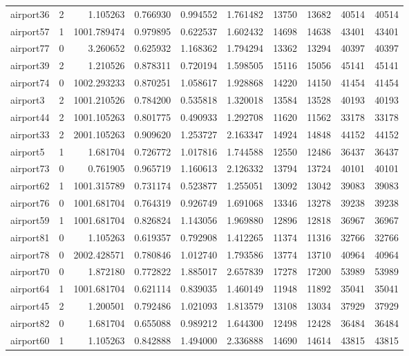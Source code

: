 \begin{longtable}{|l|r|r|r|r|r|r|r|r|r|}
airport36 & 2 & 1.105263 & 0.766930 & 0.994552 & 1.761482 & 13750 & 13682 & 40514 & 40514 \\
airport57 & 1 & 1001.789474 & 0.979895 & 0.622537 & 1.602432 & 14698 & 14638 & 43401 & 43401 \\
airport77 & 0 & 3.260652 & 0.625932 & 1.168362 & 1.794294 & 13362 & 13294 & 40397 & 40397 \\
airport39 & 2 & 1.210526 & 0.878311 & 0.720194 & 1.598505 & 15116 & 15056 & 45141 & 45141 \\
airport74 & 0 & 1002.293233 & 0.870251 & 1.058617 & 1.928868 & 14220 & 14150 & 41454 & 41454 \\
airport3 & 2 & 1001.210526 & 0.784200 & 0.535818 & 1.320018 & 13584 & 13528 & 40193 & 40193 \\
airport44 & 2 & 1001.105263 & 0.801775 & 0.490933 & 1.292708 & 11620 & 11562 & 33178 & 33178 \\
airport33 & 2 & 2001.105263 & 0.909620 & 1.253727 & 2.163347 & 14924 & 14848 & 44152 & 44152 \\
airport5 & 1 & 1.681704 & 0.726772 & 1.017816 & 1.744588 & 12550 & 12486 & 36437 & 36437 \\
airport73 & 0 & 0.761905 & 0.965719 & 1.160613 & 2.126332 & 13794 & 13724 & 40101 & 40101 \\
airport62 & 1 & 1001.315789 & 0.731174 & 0.523877 & 1.255051 & 13092 & 13042 & 39083 & 39083 \\
airport76 & 0 & 1001.681704 & 0.764319 & 0.926749 & 1.691068 & 13346 & 13278 & 39238 & 39238 \\
airport59 & 1 & 1001.681704 & 0.826824 & 1.143056 & 1.969880 & 12896 & 12818 & 36967 & 36967 \\
airport81 & 0 & 1.105263 & 0.619357 & 0.792908 & 1.412265 & 11374 & 11316 & 32766 & 32766 \\
airport78 & 0 & 2002.428571 & 0.780846 & 1.012740 & 1.793586 & 13774 & 13710 & 40964 & 40964 \\
airport70 & 0 & 1.872180 & 0.772822 & 1.885017 & 2.657839 & 17278 & 17200 & 53989 & 53989 \\
airport64 & 1 & 1001.681704 & 0.621114 & 0.839035 & 1.460149 & 11948 & 11892 & 35041 & 35041 \\
airport45 & 2 & 1.200501 & 0.792486 & 1.021093 & 1.813579 & 13108 & 13034 & 37929 & 37929 \\
airport82 & 0 & 1.681704 & 0.655088 & 0.989212 & 1.644300 & 12498 & 12428 & 36484 & 36484 \\
airport60 & 1 & 1.105263 & 0.842888 & 1.494000 & 2.336888 & 14690 & 14614 & 43815 & 43815 \\

\end{longtable}
